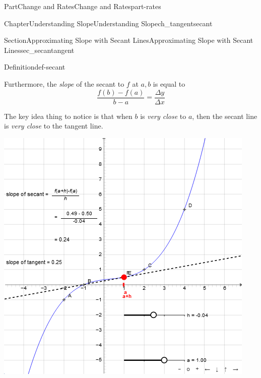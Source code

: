 \documentclass[oneside,10pt,]{tufte-book}
\numberwithin{equation}{chapter}
\begin{document}
\begin{partptx}{Part}{Change and Rates}{}{Change and Rates}{}{}{part-rates}
\begin{chapterptx}{Chapter}{Understanding Slope}{}{Understanding Slope}{}{}{ch_tangentsecant}
\begin{sectionptx}{Section}{Approximating Slope with Secant Lines}{}{Approximating Slope with Secant Lines}{}{}{sec_secantangent}
\begin{definition}{Definition}{}{def-secant}
\begin{sidebyside}{2}{0}{0}{0}
\begin{sbspanel}{0.5}
{\begin{tikzpicture}
\end{tikzpicture}
}%
\end{sbspanel}%
\end{sidebyside}%
\par
Furthermore, the \emph{slope} of the secant to \(f\) at \(a,b\) is equal to%
\begin{equation*}
\dfrac{f(b)-f(a)}{b-a} = \dfrac{\Delta y}{\Delta x}
\end{equation*}
%
\end{definition}
The key idea thing to notice is that when \(b\) is \emph{very close} to \(a\), then the secant line is \emph{very close} to the tangent line.%
\begin{sidebyside}{2}{0.075}{0.075}{0.17}%
\begin{sbspanel}{0.47}%
\includegraphics[width=\linewidth]{external/jsxgraph-derivative-limit-of-secant.png}
\end{sbspanel}%
\begin{sbspanel}{0.21}%

\end{sbspanel}
\end{sidebyside}
\end{sectionptx}
\end{chapterptx}
\end{partptx}
\end{document}
